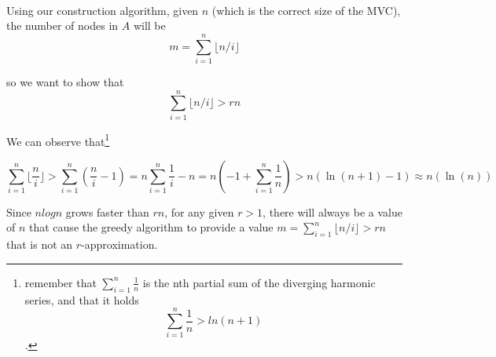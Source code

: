 \documentclass[a4paper]{article}
\begin{document}
\

Using our construction algorithm, given $n$ (which is the correct size of the MVC), the number of nodes in $A$ will be 
\[
m = \sum_{i=1}^n \lfloor n/i \rfloor
\]

so we want to show that 
\[
\sum_{i=1}^n \lfloor n/i \rfloor > rn
\]


We can observe that\footnote{remember that $\sum_{i=1}^n \frac{1}{n}$ is the nth partial sum of the diverging harmonic series, and that it holds
\[
\sum_{i=1}^n \frac{1}{n} > ln(n + 1)
\]
.}	

\[
\sum_{i=1}^n \lfloor \frac{n}{i} \rfloor > \sum_{i=1}^n (\frac{n}{i} - 1) = n \sum_{i=1}^n \frac{1}{i} - n = n(-1 + \sum_{i=1}^n \frac{1}{n}) > n(\ln{(n + 1)} - 1) \approx n(\ln{(n)})
\]

Since $nlogn$ grows faster than $rn$, for any given $r>1$, there will always be a value of $n$ that cause the greedy algorithm to provide a value $m = \sum_{i=1}^n \lfloor n/i \rfloor > rn$ that is not an $r$-approximation.
\end{document}
